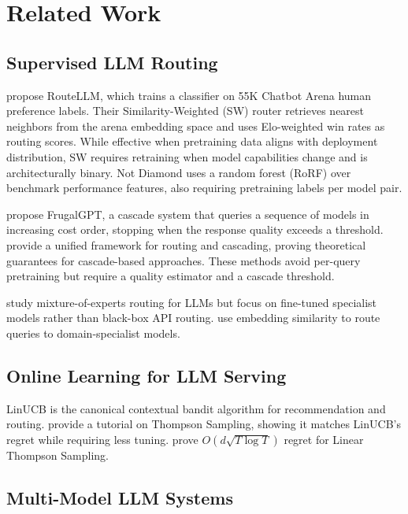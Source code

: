 \section{Related Work}
\label{sec:related}

\subsection{Supervised LLM Routing}

\citet{ong2024routellm} propose RouteLLM, which trains a classifier on 55K Chatbot Arena human preference labels. Their Similarity-Weighted (SW) router retrieves nearest neighbors from the arena embedding space and uses Elo-weighted win rates as routing scores. While effective when pretraining data aligns with deployment distribution, SW requires retraining when model capabilities change and is architecturally binary. Not Diamond \citep{notdiamond2024} uses a random forest (RoRF) over benchmark performance features, also requiring pretraining labels per model pair.

\citet{chen2023frugalgpt} propose FrugalGPT, a cascade system that queries a sequence of models in increasing cost order, stopping when the response quality exceeds a threshold. \citet{dekoninck2025unified} provide a unified framework for routing and cascading, proving theoretical guarantees for cascade-based approaches. These methods avoid per-query pretraining but require a quality estimator and a cascade threshold.

\citet{shnitzer2023large} study mixture-of-experts routing for LLMs but focus on fine-tuned specialist models rather than black-box API routing. \citet{lu2023routing} use embedding similarity to route queries to domain-specialist models.

\subsection{Online Learning for LLM Serving}

LinUCB \citep{li2010contextual} is the canonical contextual bandit algorithm for recommendation and routing. \citet{russo2018tutorial} provide a tutorial on Thompson Sampling, showing it matches LinUCB's regret while requiring less tuning. \citet{abeille2017linear} prove $O(d\sqrt{T\log T})$ regret for Linear Thompson Sampling.

\subsection{Multi-Model LLM Systems}

